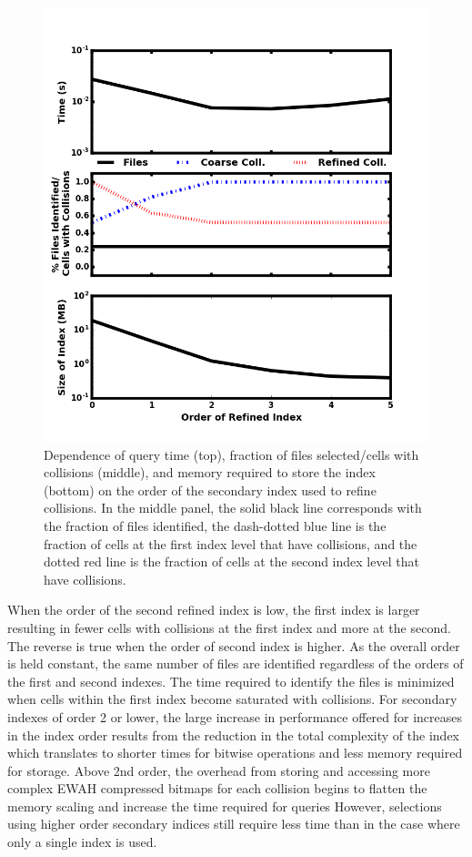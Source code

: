 \documentclass[apjl]{emulateapj}
\begin{document}
\begin{figure}[htbp]
\begin{center}
\includegraphics[width=\columnwidth,keepaspectratio]{../images/vary_order2_to6.png}
\caption{Dependence of query time (top), fraction of files selected/cells with collisions (middle), and memory required to store the index (bottom) on the order of the secondary index used to refine collisions. In the middle panel, the solid black line corresponds with the fraction of files identified, the dash-dotted blue line is the fraction of cells at the first index level that have collisions, and the dotted red line is the fraction of cells at the second index level that have collisions.}
\label{fig:test_order2}
\end{center}
\end{figure}
%

When the order of the second refined index is low, the first index is larger resulting in fewer cells with collisions at the first index and more at the second. The reverse is true when the order of second index is higher. As the overall order is held constant, the same number of files are identified regardless of the orders of the first and second indexes. The time required to identify the files is minimized when cells within the first index become saturated with collisions. For secondary indexes of order 2 or lower, the large increase in performance offered for increases in the index order results from the reduction in the total complexity of the index which translates to shorter times for bitwise operations and less memory required for storage. Above 2nd order, the overhead from storing and accessing more complex EWAH compressed bitmaps for each collision begins to flatten the memory scaling and increase the time required for queries  However, selections using higher order secondary indices still require less time than in the case where only a single index is used. 
\end{document}
